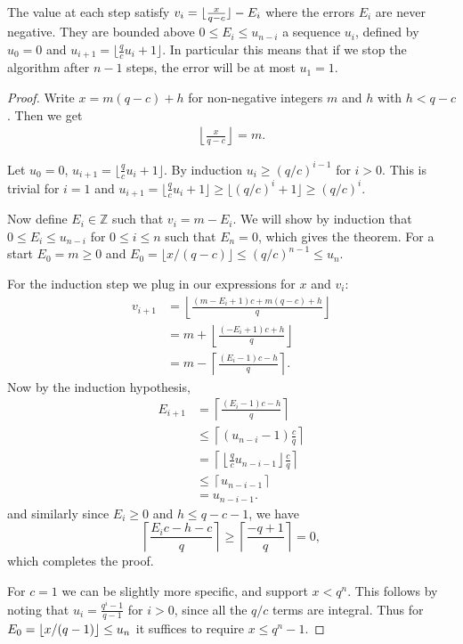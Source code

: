 The value at each step satisfy $v_i = \lfloor {\frac{x}{q-c}} \rfloor - E_i$ where
the errors $E_i$ are never negative.
They are bounded above $0\le E_i\le u_{n-i}$ a sequence $u_i$,
defined by $u_0=0$ and $u_{i+1} = \lfloor\frac{q}{c}u_i+1\rfloor$.
In particular this means that if we stop the algorithm after $n-1$ steps, the error will be at most $u_1=1$.
\begin{proof}
   Write $x = m(q-c)+h$ for non-negative integers $m$ and $h$ with $h<q-c$.
   Then we get
   \begin{align*}
      \left\lfloor\frac{x}{q-c}\right\rfloor = m.
      \label{eq:floor}
   \end{align*}

   Let $u_0=0$, $u_{i+1} = \lfloor\frac{q}{c}u_i+1\rfloor$.
   By induction $u_i \ge (q/c)^{i-1}$ for $i>0$.
   This is trivial for $i=1$ and $u_{i+1}=\lfloor \frac qc u_i +1\rfloor \ge \lfloor (q/c)^i + 1 \rfloor \ge (q/c)^i$.

   Now define $E_i\in\mathbb Z$ such that $v_i = m - E_i$.
   We will show by induction that $0\le E_{i} \le u_{n-i}$ for $0\le i\le n$ such that $E_n = 0$, which gives the theorem.
   For a start $E_0=m\ge 0$ and $E_0 = \lfloor x/(q-c)\rfloor \le (q/c)^{n-1} \le u_n$.

   For the induction step we plug in our expressions for $x$ and $v_i$:
   \begin{align*}
      v_{i+1}
      &= \left\lfloor \frac{(m-E_i+1)c+m(q-c)+h}{q}\right\rfloor
    \\&=
    m
    +
    \left\lfloor \frac{(- E_i+1)c +h}{q}\right\rfloor
    \\&=
    m
    - \left\lceil \frac{(E_i-1)c - h}{q}\right\rceil.
   \end{align*}
   Now by the induction hypothesis,
   \begin{align*}
      E_{i+1}
      &= \left\lceil \frac{(E_i-1)c - h}{q}\right\rceil
    \\&\le\left\lceil (u_{n-i}-1)\frac{c}{q}\right\rceil
    \\&= \left\lceil \left\lfloor \frac{q}{c}u_{n-i-1} \right\rfloor \frac{c}{q}\right\rceil
    \\&\le \left\lceil u_{n-i-1}\right\rceil
    \\&= u_{n-i-1}.
   \end{align*}
   and similarly since $E_i \ge 0$ and $h\le q-c-1$,
   we have
   $$\left\lceil \frac{E_ic - h - c}{q}\right\rceil \ge
   \left\lceil \frac{- q + 1}{q}\right\rceil = 0,$$
   which completes the proof.

   For $c=1$ we can be slightly more specific, and support $x < q^n$.
   This follows by noting that $u_i = \frac{q^i-1}{q-1}$ for $i>0$, since all the $q/c$ terms are integral.
   Thus for $E_0=\lfloor {x/(q-1)} \rfloor\le u_n$ it suffices to require $x\le q^n-1$.
\end{proof}
